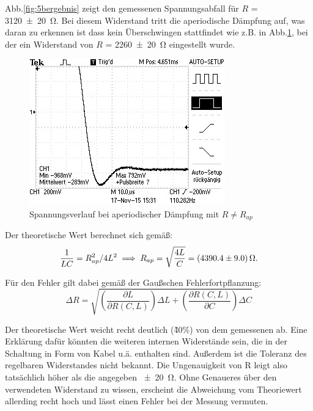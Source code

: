 Abb.\ref{fig:5bergebnis} zeigt den gemessenen Spannungsabfall für
$R$ = \SI{3120 +- 20}{\ohm}.
Bei diesem Widerstand tritt die aperiodische Dämpfung auf, was daran zu erkennen
ist dass kein Überschwingen stattfindet wie z.B. in Abb.\ref{fig:über}, bei
der ein Widerstand von $R$ = \SI{2260 +- 20}{\ohm} eingestellt wurde.
\begin{figure}
  \centering
  \includegraphics{data/F0002TEK.jpg}
  \caption{Spannungsverlauf bei aperiodischer Dämpfung mit $R \neq R_{ap}$}
  \label{fig:über}
\end{figure}

Der theoretische Wert berechnet sich gemäß:
\begin{equation}
  \frac{1}{LC} = R_{ap}^2/4L^2 \\
  \implies R_{ap} = \sqrt{\frac{4L}{C}} = \SI{4390.4 \pm 9.0}{\ohm}.
\end{equation}

Für den Fehler gilt dabei gemäß der Gaußschen Fehlerfortpflanzung:
\begin{equation}
  \Delta R = \sqrt{(\frac{\partial L}{\partial R(C,L)})\Delta L
  + (\frac{\partial R(C,L)}{\partial C})\Delta C}
  \label{eqn:gauss}
\end{equation}

Der theoretische Wert weicht recht deutlich (\~40\%) von dem gemessenen ab.
Eine Erklärung dafür könnten die weiteren internen Widerstände sein, die in
der Schaltung in Form von Kabel u.ä. enthalten sind. Außerdem ist die Toleranz
des regelbaren Widerstandes nicht bekannt. Die Ungenauigkeit von R leigt also
tatsächlich höher als die angegeben \SI{+-20}{\ohm}.
Ohne Genaueres über den verwendeten Widerstand zu wissen, erscheint die
Abweichung vom Theoriewert allerding recht hoch und lässt einen Fehler
bei der Messung vermuten.

